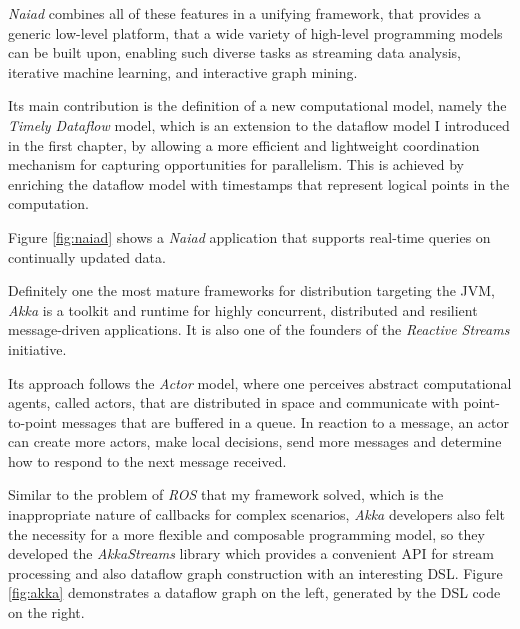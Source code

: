 \documentclass{dithesis}
\begin{document}
\textit{Naiad}\cite{naiad} combines all of these features in a unifying framework, that provides a generic low-level platform, that a wide variety of high-level programming models can be built upon, enabling such diverse tasks as streaming data analysis, iterative machine learning, and interactive graph mining.

Its main contribution is the definition of a new computational model, namely the \textit{Timely Dataflow} model, which is an extension to the dataflow model I introduced in the first chapter, by allowing a more efficient and lightweight coordination mechanism for capturing opportunities for parallelism. This is achieved by enriching the dataflow model with timestamps that represent logical points in the computation.

Figure \ref{fig:naiad} shows a \textit{Naiad} application that supports real-time queries on continually updated data.



Definitely one the most mature frameworks for distribution targeting the JVM, \textit{Akka}\cite{akka} is a toolkit and runtime for highly concurrent, distributed and resilient message-driven applications. It is also one of the founders of the \textit{Reactive Streams}\cite{rss} initiative.

Its approach follows the \textit{Actor} model\cite{actor}, where one perceives abstract computational agents, called actors, that are distributed in space and communicate with point-to-point messages that are buffered in a queue. In reaction to a message, an actor can create more actors, make local decisions, send more messages and determine how to respond to the next message received.

Similar to the problem of \textit{ROS} that my framework solved, which is the inappropriate nature of callbacks for complex scenarios, \textit{Akka} developers also felt the necessity for a more flexible and composable programming model, so they developed the \textit{AkkaStreams} library which provides a convenient API for stream processing and also dataflow graph construction with an interesting DSL. Figure \ref{fig:akka} demonstrates a dataflow graph on the left, generated by the DSL code on the right.

\end{document}
